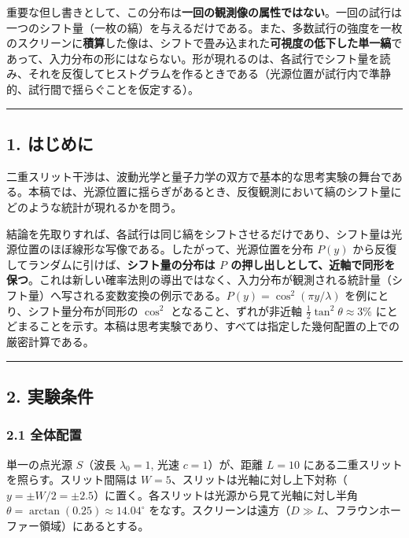 \documentclass[
]{ltjsarticle}
\begin{document}
重要な但し書きとして、この分布は\textbf{一回の観測像の属性ではない}。一回の試行は一つのシフト量（一枚の縞）を与えるだけである。また、多数試行の強度を一枚のスクリーンに\textbf{積算}した像は、シフトで畳み込まれた\textbf{可視度の低下した単一縞}であって、入力分布の形にはならない。形が現れるのは、各試行でシフト量を読み、それを反復してヒストグラムを作るときである（光源位置が試行内で準静的、試行間で揺らぐことを仮定する）。

\begin{center}\rule{0.5\linewidth}{0.5pt}\end{center}

\subsection{1. はじめに}\label{ux306fux3058ux3081ux306b}

二重スリット干渉は、波動光学と量子力学の双方で基本的な思考実験の舞台である。本稿では、光源位置に揺らぎがあるとき、反復観測において縞のシフト量にどのような統計が現れるかを問う。

結論を先取りすれば、各試行は同じ縞をシフトさせるだけであり、シフト量は光源位置のほぼ線形な写像である。したがって、光源位置を分布
\(P(y)\) から反復してランダムに引けば、\textbf{シフト量の分布は \(P\)
の押し出しとして、近軸で同形を保つ}。これは新しい確率法則の導出ではなく、入力分布が観測される統計量（シフト量）へ写される変数変換の例示である。\(P(y)=\cos^2(\pi y/\lambda)\)
を例にとり、シフト量分布が同形の \(\cos^2\) となること、ずれが非近軸
\(\tfrac12\tan^2\theta\approx3\%\)
にとどまることを示す。本稿は思考実験であり、すべては指定した幾何配置の上での厳密計算である。

\begin{center}\rule{0.5\linewidth}{0.5pt}\end{center}

\subsection{2. 実験条件}\label{ux5b9fux9a13ux6761ux4ef6}

\subsubsection{2.1 全体配置}\label{ux5168ux4f53ux914dux7f6e}

単一の点光源 \(S\)（波長 \(\lambda_0=1\), 光速 \(c=1\)）が、距離
\(L=10\) にある二重スリットを照らす。スリット間隔は
\(W=5\)、スリットは光軸に対し上下対称（\(y=\pm W/2=\pm2.5\)）に置く。各スリットは光源から見て光軸に対し半角
\(\theta=\arctan(0.25)\approx14.04^\circ\)
をなす。スクリーンは遠方（\(D\gg L\)、フラウンホーファー領域）にあるとする。
\end{document}
